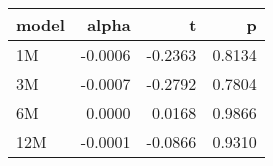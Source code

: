 \begin{table}[ht]
\centering
\begin{tabular}{lrrr}
  \hline
model & alpha & t & p \\ 
  \hline
1M & -0.0006 & -0.2363 & 0.8134 \\ 
  3M & -0.0007 & -0.2792 & 0.7804 \\ 
  6M & 0.0000 & 0.0168 & 0.9866 \\ 
  12M & -0.0001 & -0.0866 & 0.9310 \\ 
   \hline
\end{tabular}
\end{table}

